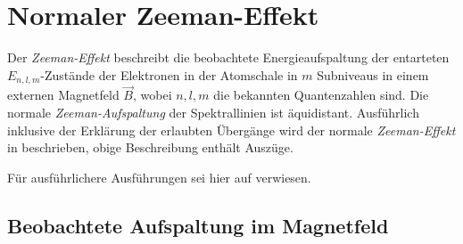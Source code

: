 \documentclass[../bericht.tex]{subfiles}
\begin{document}
              \section{Normaler Zeeman-Effekt}
              \label{sec:zeeman-effekt}

                Der \textit{Zeeman-Effekt} beschreibt die beobachtete Energieaufspaltung der entarteten $E_{n,l,m}$-Zust\"ande der Elektronen in der Atomschale in $m$ Subniveaus in einem externen Magnetfeld $\vec{B}$, wobei $n,l,m$ die bekannten Quantenzahlen sind. Die normale \textit{Zeeman-Aufspaltung} der Spektrallinien ist \"aquidistant.
                Ausf\"uhrlich inklusive der Erkl\"arung der erlaubten \"Uberg\"ange wird der normale \textit{Zeeman-Effekt} in \cite{dem:exp3-normaler-zeeman} beschrieben, obige Beschreibung enth\"alt Ausz\"uge.

                Für ausführlichere Ausführungen sei hier auf \cite{dem:exp3-normaler-zeeman} verwiesen.


                \subsection{Beobachtete Aufspaltung im Magnetfeld}
\end{document}
